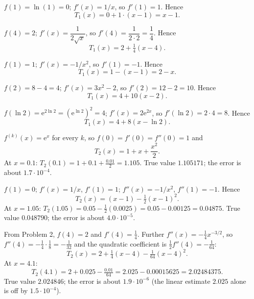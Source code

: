 \begin{solutions}
  \item $f(1)=\ln(1)=0$; $f'(x)=1/x$, so $f'(1)=1$. Hence
        \[
          T_{1}(x)=0+1\cdot(x-1)=x-1 .
        \]

  \item $f(4)=2$; $f'(x)=\dfrac{1}{2\sqrt{x}}$, so
        $f'(4)=\dfrac{1}{2\cdot 2}=\dfrac14$. Hence
        \[
          T_{1}(x)=2+\tfrac14(x-4) .
        \]

  \item $f(1)=1$; $f'(x)=-1/x^{2}$, so $f'(1)=-1$. Hence
        \[
          T_{1}(x)=1-(x-1)=2-x .
        \]

  \item $f(2)=8-4=4$; $f'(x)=3x^{2}-2$, so $f'(2)=12-2=10$. Hence
        \[
          T_{1}(x)=4+10(x-2) .
        \]

  \item $f(\ln 2)=\mathrm{e}^{2\ln 2}=(\mathrm{e}^{\ln 2})^{2}=4$;
        $f'(x)=2\mathrm{e}^{2x}$, so $f'(\ln 2)=2\cdot 4=8$. Hence
        \[
          T_{1}(x)=4+8(x-\ln 2) .
        \]

  \item $f^{(k)}(x)=\mathrm{e}^{x}$ for every $k$, so
        $f(0)=f'(0)=f''(0)=1$ and
        \[
          T_{2}(x)=1+x+\frac{x^{2}}{2} .
        \]
        At $x=0.1$: $T_{2}(0.1)=1+0.1+\tfrac{0.01}{2}=1.105$. True
        value $1.105171$; the error is about $1.7\cdot 10^{-4}$.

  \item $f(1)=0$; $f'(x)=1/x$, $f'(1)=1$; $f''(x)=-1/x^{2}$,
        $f''(1)=-1$. Hence
        \[
          T_{2}(x)=(x-1)-\tfrac12(x-1)^{2} .
        \]
        At $x=1.05$:
        $T_{2}(1.05)=0.05-\tfrac12(0.0025)=0.05-0.00125=0.04875$. True
        value $0.048790$; the error is about $4.0\cdot 10^{-5}$.

  \item From Problem 2, $f(4)=2$ and $f'(4)=\tfrac14$. Further
        $f''(x)=-\tfrac14 x^{-3/2}$, so
        $f''(4)=-\tfrac14\cdot\tfrac18=-\tfrac{1}{32}$ and the
        quadratic coefficient is
        $\tfrac12 f''(4)=-\tfrac{1}{64}$:
        \[
          T_{2}(x)=2+\tfrac14(x-4)-\tfrac{1}{64}(x-4)^{2} .
        \]
        At $x=4.1$:
        \[
          T_{2}(4.1)=2+0.025-\tfrac{0.01}{64}
                    =2.025-0.00015625=2.02484375 .
        \]
        True value $2.024846$; the error is about $1.9\cdot 10^{-6}$
        (the linear estimate $2.025$ alone is off by
        $1.5\cdot 10^{-4}$).


\end{solutions}
